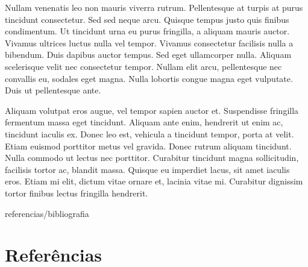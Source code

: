 \documentclass[book,A4paper,10pt,twoside,oldfontcommands]{memoir}\usepackage[]{graphicx}\usepackage[usenames,dvipsnames]{color}
\begin{document}
\begin{btUnit}
Nullam venenatis leo non mauris viverra rutrum. Pellentesque at turpis
at purus tincidunt consectetur. Sed sed neque arcu. Quisque tempus
justo quis finibus condimentum. Ut tincidunt urna eu purus fringilla,
a aliquam mauris auctor. Vivamus ultrices luctus nulla vel tempor.
Vivamus consectetur facilisis nulla a bibendum. Duis dapibus auctor
tempus. Sed eget ullamcorper nulla. Aliquam scelerisque velit nec
consectetur tempor. Nullam elit arcu, pellentesque nec convallis eu,
sodales eget magna. Nulla lobortis congue magna eget vulputate. Duis
ut pellentesque ante.

Aliquam volutpat eros augue, vel tempor sapien auctor et. Suspendisse
fringilla fermentum massa eget tincidunt. Aliquam ante enim, hendrerit
ut enim ac, tincidunt iaculis ex. Donec leo est, vehicula a tincidunt
tempor, porta at velit. Etiam euismod porttitor metus vel gravida.
Donec rutrum aliquam tincidunt. Nulla commodo ut lectus nec porttitor.
Curabitur tincidunt magna sollicitudin, facilisis tortor ac, blandit
massa. Quisque eu imperdiet lacus, sit amet iaculis eros. Etiam mi
elit, dictum vitae ornare et, lacinia vitae mi. Curabitur dignissim
tortor finibus lectus fringilla hendrerit.

\begin{btSect}{referencias/bibliografia}
\section*{Referências}
\btPrintCited
\end{btSect}

\end{btUnit}
\end{document}
